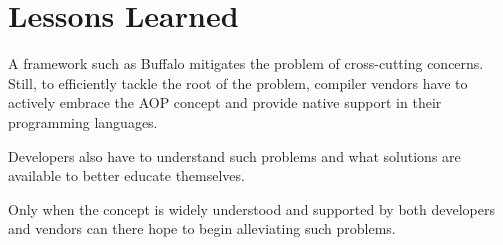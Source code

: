 \section{Lessons Learned}

A framework such as Buffalo mitigates the problem of cross-cutting concerns. Still, to efficiently tackle the root of the problem, compiler vendors have to actively embrace the AOP concept and provide native support in their programming languages.

Developers also have to understand such problems and what solutions are available to better educate themselves.

Only when the concept is widely understood and supported by both developers and vendors can there hope to begin alleviating such problems.
